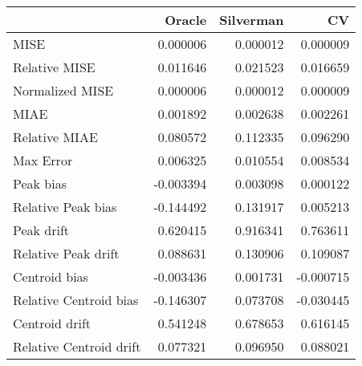 \begin{tabular}{lrrr}
  \hline
 & Oracle & Silverman & CV \\ 
  \hline
MISE & 0.000006 & 0.000012 & 0.000009 \\ 
  Relative MISE & 0.011646 & 0.021523 & 0.016659 \\ 
  Normalized MISE & 0.000006 & 0.000012 & 0.000009 \\ 
  MIAE & 0.001892 & 0.002638 & 0.002261 \\ 
  Relative MIAE & 0.080572 & 0.112335 & 0.096290 \\ 
  Max Error & 0.006325 & 0.010554 & 0.008534 \\ 
  Peak bias & -0.003394 & 0.003098 & 0.000122 \\ 
  Relative Peak bias & -0.144492 & 0.131917 & 0.005213 \\ 
  Peak drift & 0.620415 & 0.916341 & 0.763611 \\ 
  Relative Peak drift & 0.088631 & 0.130906 & 0.109087 \\ 
  Centroid bias & -0.003436 & 0.001731 & -0.000715 \\ 
  Relative Centroid bias & -0.146307 & 0.073708 & -0.030445 \\ 
  Centroid drift & 0.541248 & 0.678653 & 0.616145 \\ 
  Relative Centroid drift & 0.077321 & 0.096950 & 0.088021 \\ 
   \hline
\end{tabular}
